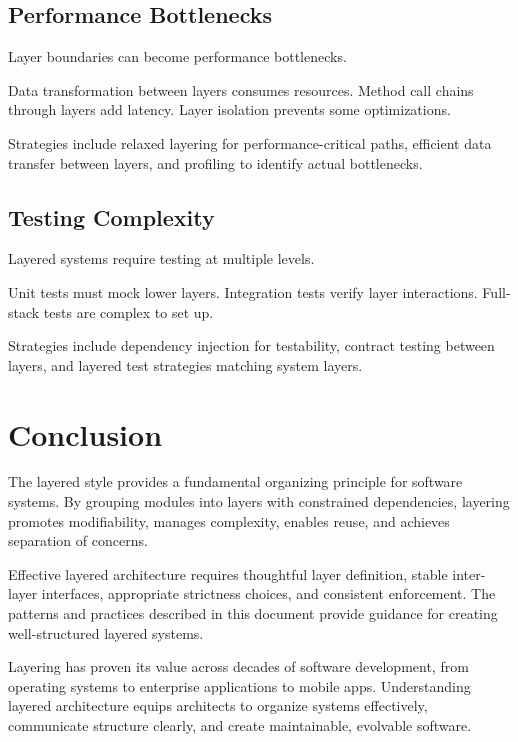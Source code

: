 \documentclass[11pt]{article}
\begin{document}
\subsection{Performance Bottlenecks}

Layer boundaries can become performance bottlenecks.

Data transformation between layers consumes resources. Method call chains through layers add latency. Layer isolation prevents some optimizations.

Strategies include relaxed layering for performance-critical paths, efficient data transfer between layers, and profiling to identify actual bottlenecks.

\subsection{Testing Complexity}

Layered systems require testing at multiple levels.

Unit tests must mock lower layers. Integration tests verify layer interactions. Full-stack tests are complex to set up.

Strategies include dependency injection for testability, contract testing between layers, and layered test strategies matching system layers.

\section{Conclusion}

The layered style provides a fundamental organizing principle for software systems. By grouping modules into layers with constrained dependencies, layering promotes modifiability, manages complexity, enables reuse, and achieves separation of concerns.

Effective layered architecture requires thoughtful layer definition, stable inter-layer interfaces, appropriate strictness choices, and consistent enforcement. The patterns and practices described in this document provide guidance for creating well-structured layered systems.

Layering has proven its value across decades of software development, from operating systems to enterprise applications to mobile apps. Understanding layered architecture equips architects to organize systems effectively, communicate structure clearly, and create maintainable, evolvable software.
\end{document}

